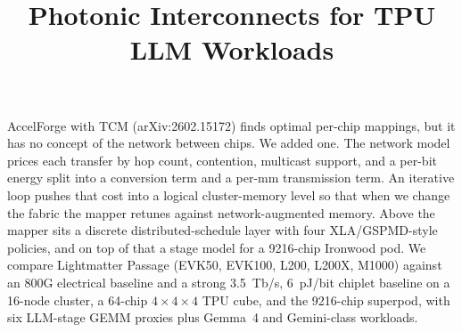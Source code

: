 \documentclass[conference,onecolumn]{IEEEtran}
\newcommand{\tbps}{Tb/s}
\newcommand{\pjbit}{pJ/bit}
\begin{document}
 
\title{Photonic Interconnects for TPU LLM Workloads}
 
\author{
\and
{}
}
 
\maketitle
 
\noindent AccelForge with TCM (arXiv:2602.15172) finds optimal
per-chip mappings, but it has no concept of the network between
chips. We added one. The network model prices each transfer by hop
count, contention, multicast support, and a per-bit energy split
into a conversion term and a per-mm transmission term. An iterative
loop pushes that cost into a logical cluster-memory level so that
when we change the fabric the mapper retunes against
network-augmented memory. Above the mapper sits a discrete
distributed-schedule layer with four XLA/GSPMD-style policies, and
on top of that a stage model for a 9216-chip Ironwood pod. We
compare Lightmatter Passage (EVK50, EVK100, L200, L200X, M1000)
against an 800G electrical baseline and a strong 3.5~\tbps{},
6~\pjbit{} chiplet baseline on a 16-node cluster, a 64-chip
$4{\times}4{\times}4$ TPU cube, and the 9216-chip superpod, with six
LLM-stage GEMM proxies plus Gemma~4 and Gemini-class workloads.
 
 
\end{document}

